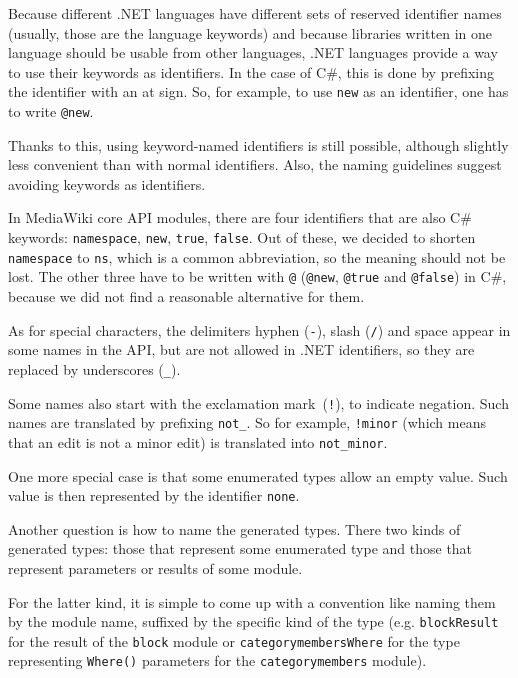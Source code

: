 \medskip

Because different .NET languages have different sets of reserved identifier names
(usually, those are the language keywords)
and because libraries written in one language should be usable from other languages,
.NET languages provide a way to use their keywords as identifiers.
In the case of C\#, this is done by prefixing the identifier with an at sign.
So, for example, to use \texttt{new} as an identifier, one has to write \lstinline{@new}.

Thanks to this, using keyword-named identifiers is still possible,
although slightly less convenient than with normal identifiers.
Also, the naming guidelines suggest avoiding keywords as identifiers.

In MediaWiki core \ac{API} modules, there are four identifiers that are also C\# keywords:
\texttt{namespace}, \texttt{new}, \texttt{true}, \texttt{false}.
Out of these, we decided to shorten \texttt{namespace} to \lstinline{ns},
which is a common abbreviation, so the meaning should not be lost.
The other three have to be written with \lstinline{@} (\lstinline{@new}, \lstinline{@true} and \lstinline{@false}) in C\#,
because we did not find a reasonable alternative for them.

\medskip

As for special characters, the delimiters hyphen (\texttt{-}), slash (\texttt{/}) and space
appear in some names in the \ac{API}, but are not allowed in .NET identifiers,
so they are replaced by underscores (\texttt{\_}).

Some names also start with the exclamation mark~(\texttt{!}), to indicate negation.
Such names are translated by prefixing \lstinline{not_}.
So for example, \texttt{!minor} (which means that an edit is not a minor edit)
is translated into \lstinline{not_minor}.

One more special case is that some enumerated types allow an empty value.
Such value is then represented by the identifier \lstinline{none}.

\medskip

Another question is how to name the generated types.
There two kinds of generated types:
those that represent some enumerated type and those that represent parameters or results of some module.

For the latter kind, it is simple to come up with a convention like naming them by the module name,
suffixed by the specific kind of the type
(e.g. \lstinline{blockResult} for the result of the \texttt{block} module
or \lstinline{categorymembersWhere} for the type representing \lstinline{Where()} parameters for the \texttt{categorymembers} module).


